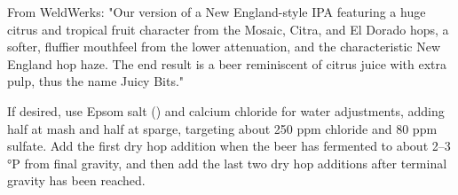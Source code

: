 \documentclass[10pt,oneside]{scrbook}
\begin{document}
\begin{aboutblock}
From WeldWerks: "Our version of a New England-style IPA featuring a huge citrus and tropical
fruit character from the Mosaic, Citra, and El Dorado hops, a softer, fluffier mouthfeel from
the lower attenuation, and the characteristic New England hop haze. The end result is a beer
reminiscent of citrus juice with extra pulp, thus the name Juicy Bits."
\end{aboutblock}


\begin{methodandtiming}
 
\begin{mashsteps}
\end{mashsteps}

\begin{fermentationsteps}
\end{fermentationsteps}

\begin{directions}
If desired, use Epsom salt () and calcium chloride for water adjustments, adding
half at mash and half at sparge, targeting about 250 ppm chloride and 80 ppm sulfate.
Add the first dry hop addition when the beer has fermented to about 2--3 °P from final gravity,
and then add the last two dry hop additions after terminal gravity has been reached.
\end{directions}

\end{methodandtiming}

\pagebreak
\end{document}
